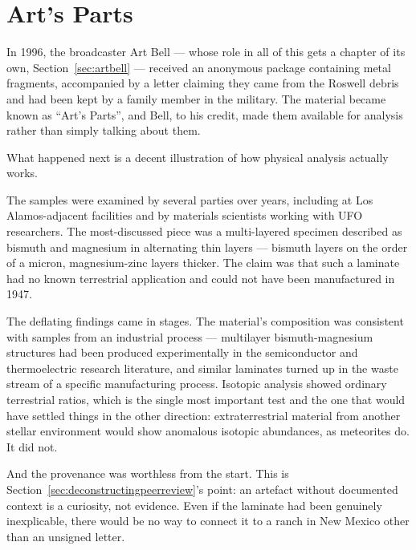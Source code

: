 \section{Art's Parts}\label{sec:artsparts}

In 1996, the broadcaster Art Bell --- whose role in all of this gets a chapter of its own,
Section~\ref{sec:artbell} --- received an anonymous package containing metal fragments, accompanied by a letter
claiming they came from the Roswell debris and had been kept by a family member in the military.
The material became known as ``Art's Parts'', and Bell, to his credit, made them available for
analysis rather than simply talking about them.

What happened next is a decent illustration of how physical analysis actually works.

The samples were examined by several parties over years, including at Los Alamos-adjacent
facilities and by materials scientists working with UFO researchers. The most-discussed piece was
a multi-layered specimen described as bismuth and magnesium in alternating thin layers ---
bismuth layers on the order of a micron, magnesium-zinc layers thicker. The claim was that such a
laminate had no known terrestrial application and could not have been manufactured in 1947.

The deflating findings came in stages. The material's composition was consistent with samples from
an industrial process --- multilayer bismuth-magnesium structures had been produced
experimentally in the semiconductor and thermoelectric research literature, and similar
laminates turned up in the waste stream of a specific manufacturing process. Isotopic analysis
showed ordinary terrestrial ratios, which is the single most important test and the one that would
have settled things in the other direction: extraterrestrial material from another stellar
environment would show anomalous isotopic abundances, as meteorites do. It did not.

And the provenance was worthless from the start.  This is Section~\ref{sec:deconstructingpeerreview}'s
point: an artefact without documented context is a curiosity, not evidence. Even if the laminate
had been genuinely inexplicable, there would be no way to connect it to a ranch in New Mexico
other than an unsigned letter.

